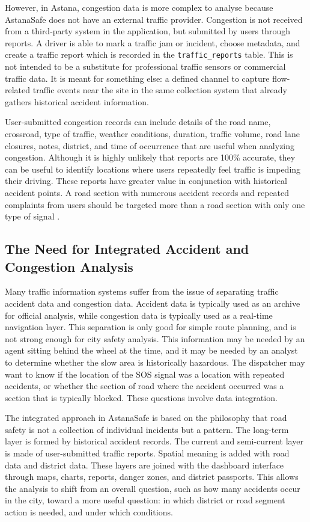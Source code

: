 ﻿\documentclass[12pt,a4paper]{report}
\begin{document}
However, in Astana, congestion data is more complex to analyse because AstanaSafe does not have an external traffic provider. Congestion is not received from a third-party system in the application, but submitted by users through reports. A driver is able to mark a traffic jam or incident, choose metadata, and create a traffic report which is recorded in the \texttt{traffic\_reports} table. This is not intended to be a substitute for professional traffic sensors or commercial traffic data. It is meant for something else: a defined channel to capture flow-related traffic events near the site in the same collection system that already gathers historical accident information.

User-submitted congestion records can include details of the road name, crossroad, type of traffic, weather conditions, duration, traffic volume, road lane closures, notes, district, and time of occurrence that are useful when analyzing congestion. Although it is highly unlikely that reports are 100\% accurate, they can be useful to identify locations where users repeatedly feel traffic is impeding their driving. These reports have greater value in conjunction with historical accident points. A road section with numerous accident records and repeated complaints from users should be targeted more than a road section with only one type of signal \cite{goodchild2007}.

\subsection{The Need for Integrated Accident and Congestion Analysis}

Many traffic information systems suffer from the issue of separating traffic accident data and congestion data. Accident data is typically used as an archive for official analysis, while congestion data is typically used as a real-time navigation layer. This separation is only good for simple route planning, and is not strong enough for city safety analysis. This information may be needed by an agent sitting behind the wheel at the time, and it may be needed by an analyst to determine whether the slow area is historically hazardous. The dispatcher may want to know if the location of the SOS signal was a location with repeated accidents, or whether the section of road where the accident occurred was a section that is typically blocked. These questions involve data integration.

The integrated approach in AstanaSafe is based on the philosophy that road safety is not a collection of individual incidents but a pattern. The long-term layer is formed by historical accident records. The current and semi-current layer is made of user-submitted traffic reports. Spatial meaning is added with road data and district data. These layers are joined with the dashboard interface through maps, charts, reports, danger zones, and district passports. This allows the analysis to shift from an overall question, such as how many accidents occur in the city, toward a more useful question: in which district or road segment action is needed, and under which conditions.
\end{document}

